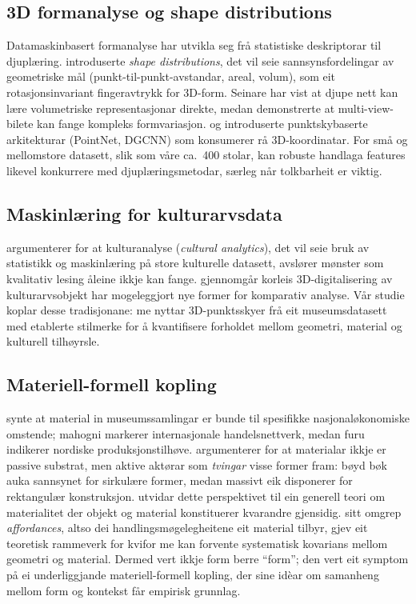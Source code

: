 \documentclass[12pt,a4paper]{article}
\begin{document}
\subsection{3D formanalyse og shape distributions}

Datamaskinbasert formanalyse har utvikla seg fr\aa{} statistiske deskriptorar til djupl\ae{}ring. \citet{osada2002shape} introduserte \emph{shape distributions}, det vil seie sannsynsfordelingar av geometriske m\aa{}l (punkt-til-punkt-avstandar, areal, volum), som eit rotasjonsinvariant fingeravtrykk for 3D-form. Seinare har \citet{wu2015shapenet} vist at djupe nett kan l\ae{}re volumetriske representasjonar direkte, medan \citet{su2015mvcnn} demonstrerte at multi-view-bilete kan fange kompleks formvariasjon. \citet{qi2017pointnet} og \citet{wang2019dgcnn} introduserte punkt\-sky\-baserte arkitekturar (PointNet, DGCNN) som konsumerer r\aa{} 3D-koordinatar. For sm\aa{} og mellomstore datasett, slik som v\aa{}re ca.~400 stolar, kan robuste handlaga features likevel konkurrere med djupl\ae{}ringsmetodar, s\ae{}rleg n\aa{}r tolkbarheit er viktig.

\subsection{Maskinl\ae{}ring for kulturarvsdata}

\citet{manovich2020} argumenterer for at kulturanalyse (\emph{cultural analytics}), det vil seie bruk av statistikk og maskinl\ae{}ring p\aa{} store kulturelle datasett, avsl\o{}rer m\o{}nster som kvalitativ lesing \aa{}leine ikkje kan fange. \citet{santos2017} gjennomg\aa{}r korleis 3D-digitalisering av kulturarvsobjekt har mogeleggjort nye former for komparativ analyse. V\aa{}r studie koplar desse tradisjonane: me nyttar 3D-punktsskyer fr\aa{} eit museumsdatasett med etablerte stilmerke for \aa{} kvantifisere forholdet mellom geometri, material og kulturell tilh\o{}yrsle.

\subsection{Materiell-formell kopling}

\citet{finne2026a} synte at material in museumssamlingar er bunde til spesifikke nasjonal\o{}konomiske omstende; mahogni markerer internasjonale handelsnettverk, medan furu indikerer nordiske produksjonstilh\o{}ve. \citet{ingold2007} argumenterer for at materialar ikkje er passive substrat, men aktive akt\o{}rar som \emph{tvingar} visse former fram: b\o{}yd b\o{}k auka sannsynet for sirkul\ae{}re former, medan massivt eik disponerer for rektangul\ae{}r konstruksjon. \citet{miller2005} utvidar dette perspektivet til ein generell teori om materialitet der objekt og material konstituerer kvarandre gjensidig. \citet{gibson1977} sitt omgrep \emph{affordances}, altso dei handlingsm\o{}gelegheitene eit material tilbyr, gjev eit teoretisk rammeverk for kvifor me kan forvente systematisk kovarians mellom geometri og material. Dermed vert ikkje form berre ``form''; den vert eit symptom p\aa{} ei underliggjande materiell-formell kopling, der \citet{alexander1964} sine id\`{e}ar om samanheng mellom form og kontekst f\aa{}r empirisk grunnlag.
\end{document}
